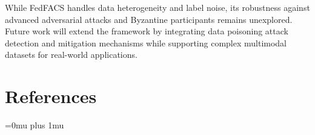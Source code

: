 \documentclass[pdflatex,sn-mathphys-num,oneside]{sn-jnl}%
\theoremstyle{thmstyleone}%
\theoremstyle{thmstyletwo}%
\theoremstyle{thmstylethree}%
\begin{document}
While FedFACS handles data heterogeneity and label noise, its robustness against advanced adversarial attacks and Byzantine participants remains unexplored. Future work will extend the framework by integrating data poisoning attack detection and mitigation mechanisms while supporting complex multimodal datasets for real-world applications.

\FloatBarrier
\backmatter


\section{References}

\begingroup
\small
\setlength{\emergencystretch}{2em}
\setlength{\parindent}{0pt}
\setlength{\parskip}{0pt}
\setlength{\leftskip}{0pt}
\setlength{\rightskip}{0pt}
\Urlmuskip=0mu plus 1mu\relax
\renewcommand{\section}[2]{}
\end{document}

